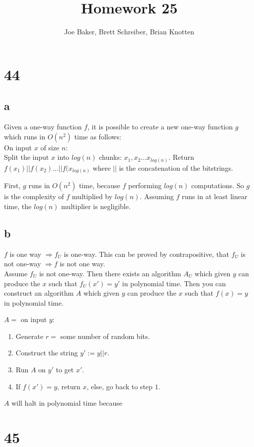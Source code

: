 \documentclass[letterpaper,notitlepage,twoside]{article}
\renewcommand{\implies}{\Rightarrow} %
\newcommand\tab[1][1cm]{\hspace*{#1}} %
\begin{document}
\title{Homework 25}
\author{Joe Baker, Brett Schreiber, Brian Knotten}
\maketitle

\section*{44}
\subsection*{a}
Given a one-way function $f$, it is possible to create a new one-way function $g$ which runs in $O(n^2)$ time as follows: \\
On input $x$ of size $n$: \\
\tab Split the input $x$ into $log(n)$ chunks: $x_1, x_2...x_{log(n)}$.
\tab Return $f(x_1) || f(x_2) ... || f(x_{log(n)}$ where $||$ is the concatenation of the bitstrings.

First, $g$ runs in $O(n^2)$ time, because $f$ performing $log(n)$ computations. So $g$ is the complexity of $f$ multiplied by $log(n)$. Assuming $f$ runs in at least linear time, the $log(n)$ multiplier is negligible.


\subsection*{b}
$f$ is one way $\implies f_U$ is one-way. This can be proved by contrapositive, that $f_U$ is not one-way $\implies f$ is not one way. \\
Assume $f_U$ is not one-way. Then there exists an algorithm $A_U$ which given $y$ can produce the $x$ such that $f_U(x') = y'$ in polynomial time. Then you can construct an algorithm $A$ which given $y$ can produce the $x$ such that $f(x) = y$ in polynomial time.

$A =$ on input $y$:
\begin{enumerate}
\item Generate $r = $ some number of random bits.
\item Construct the string $y' := y || r$.
\item Run $A$ on $y'$ to get $x'$.
\item If $f(x') = y$, return $x$, else, go back to step $1$.
\end{enumerate}

$A$ will halt in polynomial time because \\

\section*{45}
\end{document}
